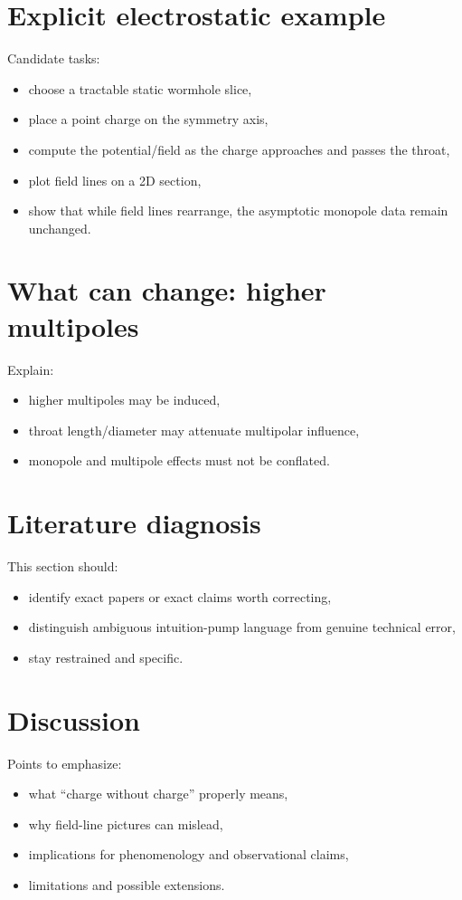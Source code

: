 \documentclass[11pt]{article}
\begin{document}
\section{Explicit electrostatic example}

Candidate tasks:
\begin{itemize}
    \item choose a tractable static wormhole slice,
    \item place a point charge on the symmetry axis,
    \item compute the potential/field as the charge approaches and passes the throat,
    \item plot field lines on a 2D section,
    \item show that while field lines rearrange, the asymptotic monopole data remain unchanged.
\end{itemize}

\section{What can change: higher multipoles}

Explain:
\begin{itemize}
    \item higher multipoles may be induced,
    \item throat length/diameter may attenuate multipolar influence,
    \item monopole and multipole effects must not be conflated.
\end{itemize}

\section{Literature diagnosis}

This section should:
\begin{itemize}
    \item identify exact papers or exact claims worth correcting,
    \item distinguish ambiguous intuition-pump language from genuine technical error,
    \item stay restrained and specific.
\end{itemize}

\section{Discussion}

Points to emphasize:
\begin{itemize}
    \item what ``charge without charge'' properly means,
    \item why field-line pictures can mislead,
    \item implications for phenomenology and observational claims,
    \item limitations and possible extensions.
\end{itemize}



\end{document}
